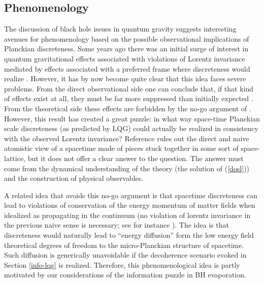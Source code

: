 \documentclass[aps, nofootinbib,superscriptaddress,12pt]{revtex4-2}
\begin{document}
\subsection{Phenomenology}\label{pheno}


The discussion of black hole issues in quantum gravity suggests interesting avenues for phenomenology based on the possible observational implications of Planckian discreteness. Some years ago there was an initial surge of interest in quantum gravitational effects associated with violations of Lorentz invariance mediated by effects associated with a preferred frame where discreteness would realize \cite{AmelinoCamelia:1997gz, AmelinoCamelia:1998ax, Ahluwalia:1999aj}.  However, it  has by now  become  quite clear  that this idea  faces  severe  problems. From   the  direct  observational side one   can conclude  that,   if  that kind of    effects   exist  at all,  they  must  be far more suppressed than initially  expected \cite{Jacobson:2002ye, Ackermann:2009aa}.  From the theoretical side these effects are forbidden by the no-go argument of \cite{Collins:2004bp}.   However,  this  result has created a great puzzle:  in what way  space-time Planckian  scale  discreteness (as predicted by LQG) could actually be realized in consistency with the observed Lorentz invariance? Reference \cite{Collins:2004bp} rules out the  direct  and  naive atomistic view of a spacetime made of pieces stuck together in some sort of space-lattice, but it does not offer  a  clear  answer   to  the  question. The answer must come from the dynamical understanding of the theory (the solution of (\ref{dosl})) and the construction of physical observables. 

A related idea that avoids this no-go argument is that spacetime discreteness can lead to violations of conservation of the energy momentum of matter fields when idealized as propagating in the continuum (no violation of lorentz invariance in the previous naive sense is necessary; see for instance \cite{Dowker:2003hb, Philpott:2008vd}). The idea is that discreteness would naturally lead to ``energy diffusion'' form the low energy field theoretical degrees of freedom to the micro-Planckian structure of spacetime. 
Such diffusion is generically unavoidable if the decoherence scenario evoked in Section \ref{info-lqg} is realized. 
Therefore, this phenomenological idea is partly motivated by our considerations of the information puzzle in BH evaporation.
\end{document}
